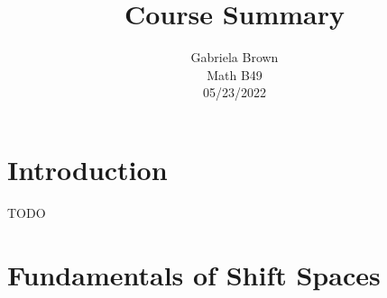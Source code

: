 \documentclass[11pt, reqno]{amsart}
\title{Course Summary}
\author{Gabriela Brown\\ Math B49 \\ 05/23/2022}
\theoremstyle{plain}
\theoremstyle{definition}
\begin{document}
\maketitle

 {
  \setlength{\parskip}{4.4pt}   
  \tableofcontents
 }


\section{Introduction}
TODO

\section{Fundamentals of Shift Spaces}







\end{document}

